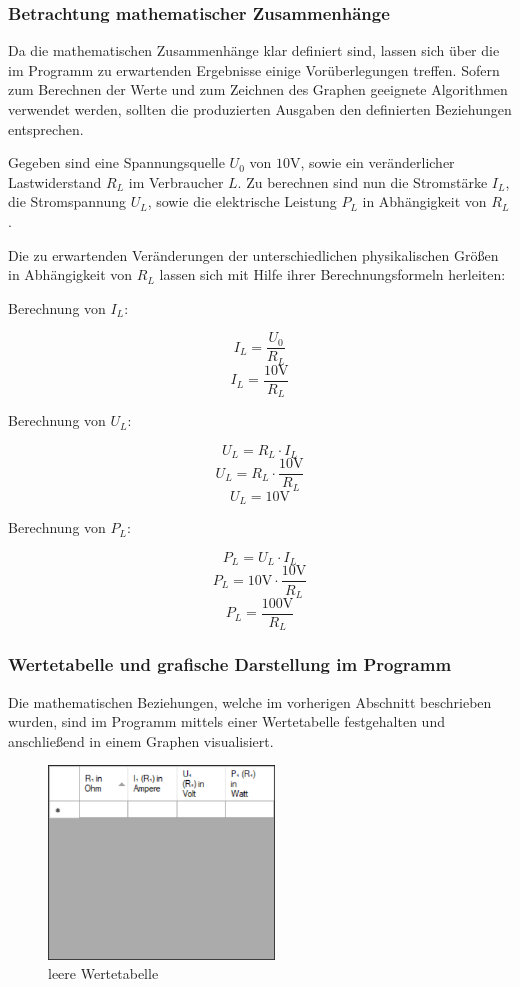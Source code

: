 \documentclass[a4paper]{article}
\begin{document}
    \subsubsection{Betrachtung mathematischer Zusammenhänge}

    Da die mathematischen Zusammenhänge klar definiert sind, lassen sich über die im Programm zu erwartenden Ergebnisse einige Vorüberlegungen treffen.
    Sofern zum Berechnen der Werte und zum Zeichnen des Graphen geeignete Algorithmen verwendet werden, sollten die produzierten Ausgaben den definierten Beziehungen entsprechen.

    Gegeben sind eine Spannungsquelle $U_0$ von $10 \si{\volt}$, sowie ein veränderlicher Lastwiderstand $R_L$ im Verbraucher $L$.
    Zu berechnen sind nun die Stromstärke $I_L$, die Stromspannung $U_L$, sowie die elektrische Leistung $P_L$ in Abhängigkeit von $R_L$.

    Die zu erwartenden Veränderungen der unterschiedlichen physikalischen Größen in Abhängigkeit von $R_L$ lassen sich mit Hilfe ihrer Berechnungsformeln herleiten:

    Berechnung von $I_L$:

    \[ I_L = \frac{U_0}{R_L} \]
    \[ I_L = \frac{10\si{\volt}}{R_L} \]

    Berechnung von $U_L$:

    \[ U_L = R_L \cdot I_L \]
    \[ U_L = R_L \cdot \frac{10\si{\volt}}{R_L} \]
    \[ U_L = 10\si{\volt} \]

    Berechnung von $P_L$:

    \[ P_L = U_L \cdot I_L \]
    \[ P_L = 10\si{\volt} \cdot \frac{10\si{\volt}}{R_L} \]
    \[ P_L = \frac{100\si{\volt}}{R_L} \]

    \subsubsection{Wertetabelle und grafische Darstellung im Programm}
    
    Die mathematischen Beziehungen, welche im vorherigen Abschnitt beschrieben wurden, sind im Programm mittels einer Wertetabelle festgehalten und anschließend in einem Graphen visualisiert.
    \begin{figure}[!h]
        \begin{center}
            \includegraphics[width=6cm]{img/tabelle}
            \caption{leere Wertetabelle}
            \label{fig:tabelle}
        \end{center}
    \end{figure}
\end{document}
